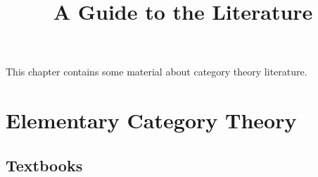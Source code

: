 

%



\title{A Guide to the Literature}

\maketitle

\label{section-phantom}

This chapter contains some material about category theory literature.

\ChapterTableOfContents

\section{Elementary Category Theory}\label{section-elementary-category-theory}
\subsection{Textbooks}\label{subsection-elementary-category-theory-textbooks}
\begin{appendices}

\end{appendices}

